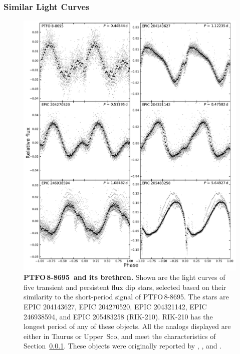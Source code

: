 \documentclass[12pt,twocolumn,tighten,trackchanges]{aastex62}
\newcommand{\ptfo}{PTFO$\,$8-8695}
\begin{document}
\subsubsection{Similar Light Curves}
\label{subsec:dipstars}

\begin{figure}[hbtp]
	\begin{center}
		\leavevmode
		\includegraphics[width=1\textwidth]{f7.pdf}
	\end{center}
	\vspace{-0.7cm}
  \caption{ {\bf \ptfo\ and its brethren.}
    Shown are the light curves of five transient and persistent flux
    dip stars, selected based on their similarity to the short-period
    signal of \ptfo.  The stars are EPIC 204143627, EPIC 204270520,
    EPIC 204321142, EPIC 246938594, and EPIC 205483258 (RIK-210).
    RIK-210 has the longest period of any of these objects.  All the
    analogs displayed are either in Taurus or Upper~Sco, and meet the
    characteristics of Section~\ref{subsec:dipstars}.  These objects
    were originally reported by \citet{stauffer_orbiting_2017},
    \citet{david_transient_2017}, and \citet{rebull_usco_2018}.
		\label{fig:brethren}
	}
\end{figure}
\end{document}
